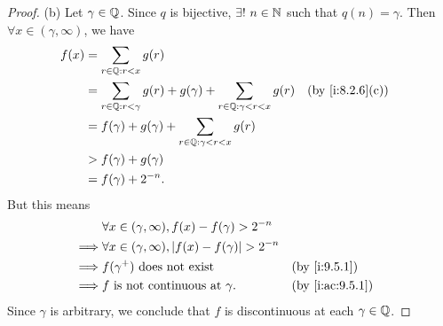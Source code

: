 \begin{proof}{(b)}
  Let \(\gamma \in \mathbb{Q}\).
  Since \(q\) is bijective, \(\exists!\ n \in \mathbb{N}\) such that \(q(n) = \gamma\).
  Then \(\forall x \in (\gamma, \infty)\), we have
  \begin{align*}
    f(x) & = \sum_{r \in \Q : r < x} g(r)                                                                               \\
         & = \sum_{r \in \Q : r < \gamma} g(r) + g(\gamma) + \sum_{r \in \Q : \gamma < r < x} g(r) &  & \by{i:8.2.6}[c] \\
         & = f(\gamma) + g(\gamma) + \sum_{r \in \Q : \gamma < r < x} g(r)                                              \\
         & > f(\gamma) + g(\gamma)                                                                                      \\
         & = f(\gamma) + 2^{-n}.
  \end{align*}
  But this means
  \begin{align*}
             & \forall x \in (\gamma, \infty), f(x) - f(\gamma) > 2^{-n}                            \\
    \implies & \forall x \in (\gamma, \infty), \abs{f(x) - f(\gamma)} > 2^{-n}                      \\
    \implies & f(\gamma^+) \text{ does not exist}                              &  & \by{i:9.5.1}    \\
    \implies & f \text{ is not continuous at } \gamma.                         &  & \by{i:ac:9.5.1}
  \end{align*}
  Since \(\gamma\) is arbitrary, we conclude that \(f\) is discontinuous at each \(\gamma \in \mathbb{Q}\).
\end{proof}

